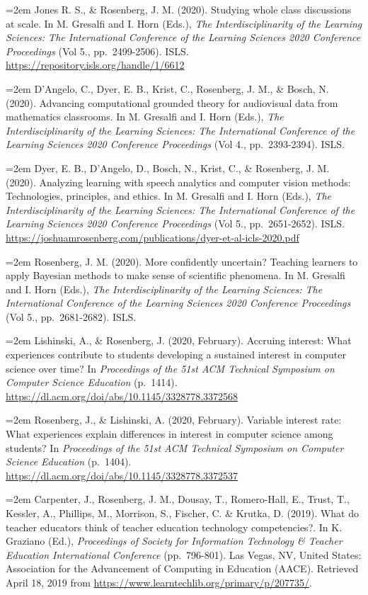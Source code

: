 \documentclass[
  14,
]{article}
\begin{document}
\hangindent=2em Jones R. S., \& Rosenberg, J. M. (2020). Studying whole
class discussions at scale. In M. Gresalfi and I. Horn (Eds.), \emph{The
Interdisciplinarity of the Learning Sciences: The International
Conference of the Learning Sciences 2020 Conference Proceedings} (Vol
5., pp.~2499-2506). ISLS.
\url{https://repository.isls.org/handle/1/6612}

\hangindent=2em D'Angelo, C., Dyer, E. B., Krist, C., Rosenberg, J. M.,
\& Bosch, N. (2020). Advancing computational grounded theory for
audiovisual data from mathematics classrooms. In M. Gresalfi and I. Horn
(Eds.), \emph{The Interdisciplinarity of the Learning Sciences: The
International Conference of the Learning Sciences 2020 Conference
Proceedings} (Vol 4., pp.~2393-2394). ISLS.

\hangindent=2em Dyer, E. B., D'Angelo, D., Bosch, N., Krist, C., \&
Rosenberg, J. M. (2020). Analyzing learning with speech analytics and
computer vision methods: Technologies, principles, and ethics. In M.
Gresalfi and I. Horn (Eds.), \emph{The Interdisciplinarity of the
Learning Sciences: The International Conference of the Learning Sciences
2020 Conference Proceedings} (Vol 5., pp.~2651-2652). ISLS.
\url{https://joshuamrosenberg.com/publications/dyer-et-al-icls-2020.pdf}

\hangindent=2em Rosenberg, J. M. (2020). More confidently uncertain?
Teaching learners to apply Bayesian methods to make sense of scientific
phenomena. In M. Gresalfi and I. Horn (Eds.), \emph{The
Interdisciplinarity of the Learning Sciences: The International
Conference of the Learning Sciences 2020 Conference Proceedings} (Vol
5., pp.~2681-2682). ISLS.

\hangindent=2em Lishinski, A., \& Rosenberg, J. (2020, February).
Accruing interest: What experiences contribute to students developing a
sustained interest in computer science over time? In \emph{Proceedings
of the 51st ACM Technical Symposium on Computer Science Education}
(p.~1414). \url{https://dl.acm.org/doi/abs/10.1145/3328778.3372568}

\hangindent=2em Rosenberg, J., \& Lishinski, A. (2020, February).
Variable interest rate: What experiences explain differences in interest
in computer science among students? In \emph{Proceedings of the 51st ACM
Technical Symposium on Computer Science Education} (p.~1404).
\url{https://dl.acm.org/doi/abs/10.1145/3328778.3372537}

\hangindent=2em Carpenter, J., Rosenberg, J. M., Dousay, T.,
Romero-Hall, E., Trust, T., Kessler, A., Phillips, M., Morrison, S.,
Fischer, C. \& Krutka, D. (2019). What do teacher educators think of
teacher education technology competencies?. In K. Graziano (Ed.),
\emph{Proceedings of Society for Information Technology \& Teacher
Education International Conference} (pp.~796-801). Las Vegas, NV, United
States: Association for the Advancement of Computing in Education
(AACE). Retrieved April 18, 2019 from
\url{https://www.learntechlib.org/primary/p/207735/}.
\end{document}
